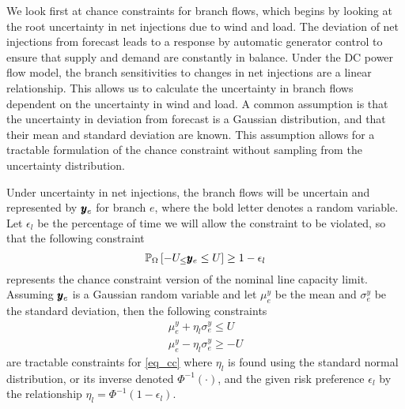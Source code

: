 We look first at chance constraints for branch flows, which begins by looking at the root uncertainty in net injections due to wind and load. The deviation of net injections from forecast leads to a response by automatic generator control to ensure that supply and demand are constantly in balance.  Under the DC power flow model, the branch sensitivities to changes in net injections are a linear relationship.  This allows us to calculate the uncertainty in branch flows dependent on the uncertainty in wind and load.  A common assumption is that the uncertainty in deviation from forecast is a Gaussian distribution,  and that their mean and standard deviation are known.  This assumption allows for a tractable formulation of the chance constraint without sampling from the uncertainty distribution. 

Under uncertainty in net injections, the branch flows will be uncertain and represented by $\pmb{y}_e$ for branch $e$, where the bold letter denotes a random variable.  Let $\epsilon_l$ be the percentage of time we will allow the constraint to be violated, so that the following constraint 
\begin{equation}\label{eq_cc}
 \mathbb{P}_{\Omega} \left[   -U_ \leq  \pmb{y}_e \leq U  \right] \geq 1- \epsilon_l
\end{equation}
represents the chance constraint version of the nominal line capacity limit.  Assuming $\pmb{y}_e$ is a Gaussian random variable and let $\mu^y_e$ be the mean and $\sigma^y_e$ be the standard deviation, then the following constraints
\begin{align*}
 \mu^y_e + \eta_l \sigma^y_e \leq U \\
 \mu^y_e - \eta_l \sigma^y_e \geq -U 
\end{align*}
are tractable constraints for \ref{eq_cc} where $\eta_l$ is found using the standard normal distribution, or its inverse denoted $\Phi^{-1} ( \cdot )$, and the given risk preference $\epsilon_l$ by the relationship $\eta_l = \Phi^{-1}\left(1-\epsilon_l\right)$.

